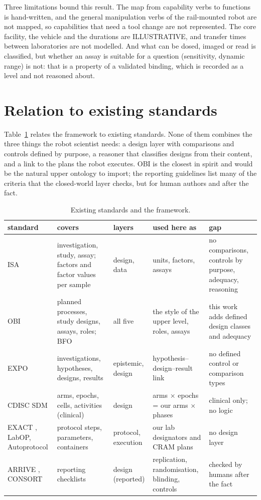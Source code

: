 \documentclass[10pt,a4paper]{article}
\begin{document}
Three limitations bound this result. The map from capability verbs to functions is hand-written, and the general
manipulation verbs of the rail-mounted robot are not mapped, so capabilities that need a tool change are not
represented. The core facility, the vehicle and the durations are ILLUSTRATIVE, and transfer times between
laboratories are not modelled. And what can be dosed, imaged or read is classified, but whether an assay is suitable
for a question (sensitivity, dynamic range) is not: that is a property of a validated binding, which is recorded as a
level and not reasoned about.


\section{Relation to existing standards}\label{sec:related}
Table~\ref{tab:std} relates the framework to existing standards. None of them combines the three things the robot
scientist needs: a design layer with comparisons and controls defined by purpose, a reasoner that classifies designs
from their content, and a link to the plans the robot executes. OBI is the closest in spirit and would be the natural
upper ontology to import; the reporting guidelines list many of the criteria that the closed-world layer checks, but
for human authors and after the fact.

\begin{table}[tbp]\centering\footnotesize
\caption{Existing standards and the framework.}\label{tab:std}
\begin{tabularx}{\linewidth}{@{}p{3.0cm}Xp{1.8cm}XX@{}}\toprule standard & covers & layers & used here as & gap \\ \midrule
ISA \citep{sansone2012} & investigation, study, assay; factors and factor values per sample & design, data & units, factors, assays & no comparisons, controls by purpose, adequacy, reasoning \\
OBI \citep{bandrowski2016} & planned processes, study designs, assays, roles; BFO & all five & the style of the upper level, roles, assays & this work adds defined design classes and adequacy \\
EXPO \citep{soldatova2006} & investigations, hypotheses, designs, results & epistemic, design & hypothesis--design--result link & no defined control or comparison types \\
CDISC SDM \citep{cdisc_sdm} & arms, epochs, cells, activities (clinical) & design & arms $\times$ epochs = our arms $\times$ phases & clinical only; no logic \\
EXACT \citep{soldatova2008}, LabOP, Autoprotocol & protocol steps, parameters, containers & protocol, execution & our lab designators and CRAM plans & no design layer \\
ARRIVE \citep{kilkenny2010}, CONSORT \citep{schulz2010} & reporting checklists & design (reported) & replication, randomisation, blinding, controls & checked by humans after the fact \\
\bottomrule\end{tabularx}\end{table}
\end{document}
